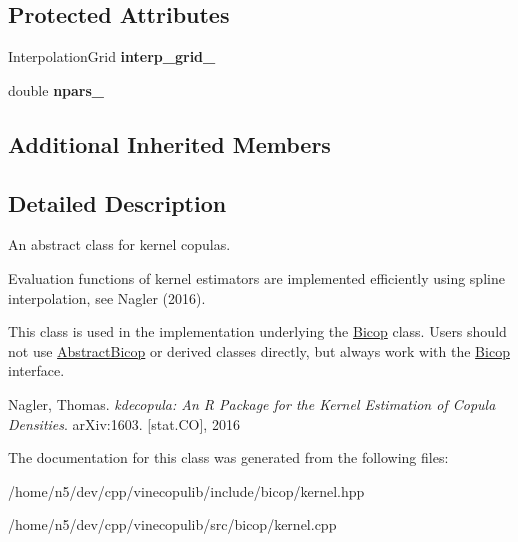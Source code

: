 \subsection*{Protected Attributes}
\begin{DoxyCompactItemize}
\item 
Interpolation\+Grid {\bfseries interp\+\_\+grid\+\_\+}\hypertarget{classvinecopulib_1_1_kernel_bicop_aa8cfe1dd0786d692562252de05c46588}{}\label{classvinecopulib_1_1_kernel_bicop_aa8cfe1dd0786d692562252de05c46588}

\item 
double {\bfseries npars\+\_\+}\hypertarget{classvinecopulib_1_1_kernel_bicop_a1b49a0a2630e71079c08ebdca79b06b6}{}\label{classvinecopulib_1_1_kernel_bicop_a1b49a0a2630e71079c08ebdca79b06b6}

\end{DoxyCompactItemize}
\subsection*{Additional Inherited Members}


\subsection{Detailed Description}
An abstract class for kernel copulas. 

Evaluation functions of kernel estimators are implemented efficiently using spline interpolation, see Nagler (2016).

This class is used in the implementation underlying the \hyperlink{classvinecopulib_1_1_bicop}{Bicop} class. Users should not use \hyperlink{classvinecopulib_1_1_abstract_bicop}{Abstract\+Bicop} or derived classes directly, but always work with the \hyperlink{classvinecopulib_1_1_bicop}{Bicop} interface.

Nagler, Thomas. {\itshape kdecopula\+: An R Package for the Kernel Estimation of Copula Densities}. ar\+Xiv\+:1603. \mbox{[}stat.\+CO\mbox{]}, 2016 

The documentation for this class was generated from the following files\+:\begin{DoxyCompactItemize}
\item 
/home/n5/dev/cpp/vinecopulib/include/bicop/kernel.\+hpp\item 
/home/n5/dev/cpp/vinecopulib/src/bicop/kernel.\+cpp\end{DoxyCompactItemize}
